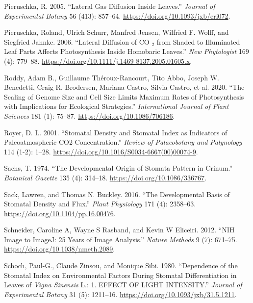 \documentclass[12pt,halfline,a4paper,]{ouparticle}
\newlength{\cslhangindent}
\newlength{\cslentryspacingunit} %
\newenvironment{CSLReferences}[2] %
 {%
  \setlength{\parindent}{0pt}
  \ifodd #1
  \let\oldpar\par
  \def\par{\hangindent=\cslhangindent\oldpar}
  \fi
  \setlength{\parskip}{#2\cslentryspacingunit}
 }%
 {}
\begin{document}
\begin{CSLReferences}{1}{0}
\leavevmode{}%
Pieruschka, R. 2005. {``Lateral Gas Diffusion Inside Leaves.''}
\emph{Journal of Experimental Botany} 56 (413): 857--64.
\url{https://doi.org/10.1093/jxb/eri072}.

\leavevmode{}%
Pieruschka, Roland, Ulrich Schurr, Manfred Jensen, Wilfried F. Wolff,
and Siegfried Jahnke. 2006. {``Lateral Diffusion of {CO}
\(_{\textrm{2}}\) from Shaded to Illuminated Leaf Parts Affects
Photosynthesis Inside Homobaric Leaves.''} \emph{New Phytologist} 169
(4): 779--88. \url{https://doi.org/10.1111/j.1469-8137.2005.01605.x}.

\leavevmode{}%
Roddy, Adam B., Guillaume Théroux-Rancourt, Tito Abbo, Joseph W.
Benedetti, Craig R. Brodersen, Mariana Castro, Silvia Castro, et al.
2020. {``The {Scaling} of {Genome} {Size} and {Cell} {Size} {Limits}
{Maximum} {Rates} of {Photosynthesis} with {Implications} for
{Ecological} {Strategies}.''} \emph{International Journal of Plant
Sciences} 181 (1): 75--87. \url{https://doi.org/10.1086/706186}.

\leavevmode{}%
Royer, D. L. 2001. {``Stomatal Density and Stomatal Index as Indicators
of Paleoatmospheric {CO2} Concentration.''} \emph{Review of Palaeobotany
and Palynology} 114 (1-2): 1--28.
\url{https://doi.org/10.1016/S0034-6667(00)00074-9}.

\leavevmode{}%
Sachs, T. 1974. {``The {Developmental} {Origin} of {Stomata} {Pattern}
in {Crinum}.''} \emph{Botanical Gazette} 135 (4): 314--18.
\url{https://doi.org/10.1086/336767}.

\leavevmode{}%
Sack, Lawren, and Thomas N. Buckley. 2016. {``The {Developmental}
{Basis} of {Stomatal} {Density} and {Flux}.''} \emph{Plant Physiology}
171 (4): 2358--63. \url{https://doi.org/10.1104/pp.16.00476}.

\leavevmode{}%
Schneider, Caroline A, Wayne S Rasband, and Kevin W Eliceiri. 2012.
{``{NIH} {Image} to {ImageJ}: 25 Years of Image Analysis.''}
\emph{Nature Methods} 9 (7): 671--75.
\url{https://doi.org/10.1038/nmeth.2089}.

\leavevmode{}%
Schoch, Paul-G., Claude Zinsou, and Monique Sibi. 1980. {``Dependence of
the {Stomatal} {Index} on {Environmental} {Factors} During {Stomatal}
{Differentiation} in {Leaves} of \emph{{Vigna} Sinensis} {L}.: 1.
{EFFECT} {OF} {LIGHT} {INTENSITY}.''} \emph{Journal of Experimental
Botany} 31 (5): 1211--16. \url{https://doi.org/10.1093/jxb/31.5.1211}.


\end{CSLReferences}
\end{document}
